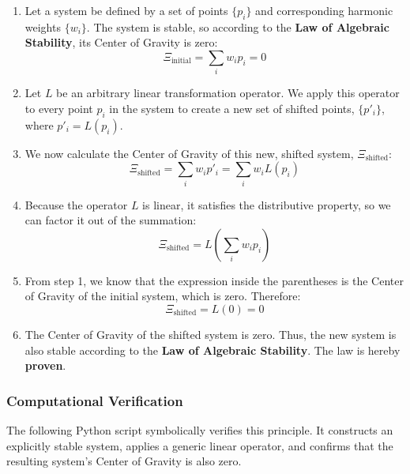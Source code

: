 \begin{enumerate}
    \item Let a system be defined by a set of points $\{p_i\}$ and corresponding harmonic weights $\{w_i\}$. The system is stable, so according to the \textbf{Law of Algebraic Stability}, its Center of Gravity is zero:
    $$ \Xi_{\text{initial}} = \sum_{i} w_i p_i = 0 $$
    
    \item Let $L$ be an arbitrary linear transformation operator. We apply this operator to every point $p_i$ in the system to create a new set of shifted points, $\{p'_i\}$, where $p'_i = L(p_i)$.
    
    \item We now calculate the Center of Gravity of this new, shifted system, $\Xi_{\text{shifted}}$:
    $$ \Xi_{\text{shifted}} = \sum_{i} w_i p'_i = \sum_{i} w_i L(p_i) $$
    
    \item Because the operator $L$ is linear, it satisfies the distributive property, so we can factor it out of the summation:
    $$ \Xi_{\text{shifted}} = L\left(\sum_{i} w_i p_i\right) $$
    
    \item From step 1, we know that the expression inside the parentheses is the Center of Gravity of the initial system, which is zero. Therefore:
    $$ \Xi_{\text{shifted}} = L(0) = 0 $$
    
    \item The Center of Gravity of the shifted system is zero. Thus, the new system is also stable according to the \textbf{Law of Algebraic Stability}. The law is hereby \textbf{proven}.
\end{enumerate}

\subsubsection*{Computational Verification}
The following Python script symbolically verifies this principle. It constructs an explicitly stable system, applies a generic linear operator, and confirms that the resulting system's Center of Gravity is also zero.

